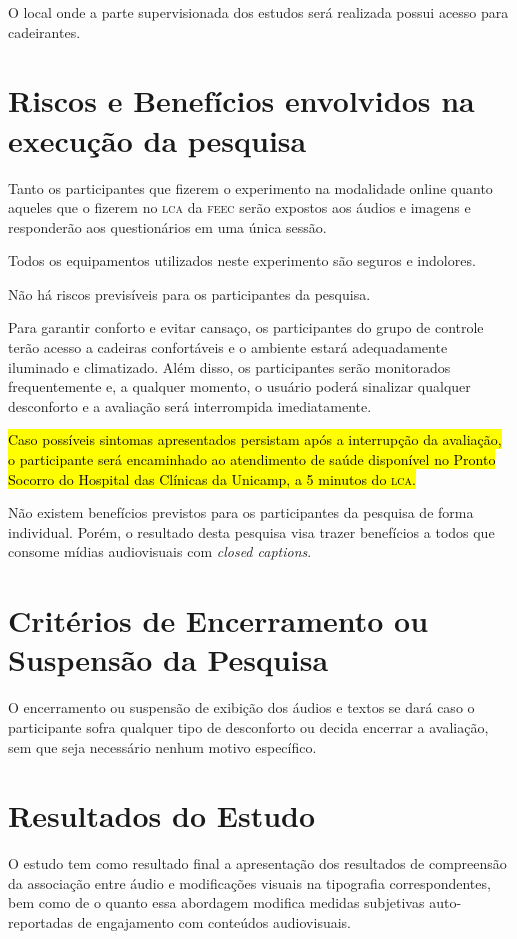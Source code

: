 \documentclass[a4paper,11pt,titlepage,singlespacing]{article}
\begin{document}
O local onde a parte supervisionada dos estudos será realizada possui acesso para cadeirantes.

\section{Riscos e Benefícios envolvidos na execução da pesquisa}
\noindent Tanto os participantes que fizerem o experimento na modalidade online quanto aqueles que o fizerem no \textsc{lca} da \textsc{feec} serão expostos aos áudios e imagens e responderão aos questionários em uma única sessão.

Todos os equipamentos utilizados neste experimento são seguros e indolores. 

Não há riscos previsíveis para os participantes da pesquisa.

Para garantir conforto e evitar cansaço, os participantes do grupo de controle terão acesso a cadeiras confortáveis e o ambiente estará adequadamente iluminado e climatizado. Além disso, os participantes serão monitorados frequentemente e, a qualquer momento, o usuário poderá sinalizar qualquer desconforto e a avaliação será interrompida imediatamente. 

\hl{Caso possíveis sintomas apresentados persistam após a interrupção da avaliação, o participante será encaminhado ao atendimento de saúde disponível no Pronto Socorro do Hospital das Clínicas da Unicamp, a 5 minutos do \textsc{lca}.}

Não existem benefícios previstos para os participantes da pesquisa de forma individual. Porém, o resultado desta pesquisa visa trazer benefícios a todos que consome mídias audiovisuais com \textit{closed captions}.

\section{Critérios de Encerramento ou Suspensão da Pesquisa}
\noindent O encerramento ou suspensão de exibição dos áudios e textos se dará caso o participante sofra qualquer tipo de desconforto ou decida encerrar a avaliação, sem que seja necessário nenhum motivo específico. 

\section{Resultados do Estudo}
\noindent O estudo tem como resultado final a apresentação dos resultados de compreensão da associação entre áudio e modificações visuais na tipografia correspondentes, bem como de o quanto essa abordagem modifica medidas subjetivas auto-reportadas de engajamento com conteúdos audiovisuais.
\end{document}
